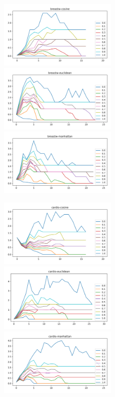 \begin{figure}[!t]
\includegraphics[width=2.2in]{kdd/static/lfd_vs_depth/breastw-cosine.png}
\includegraphics[width=2.2in]{kdd/static/lfd_vs_depth/breastw-euclidean.png}
\includegraphics[width=2.2in]{kdd/static/lfd_vs_depth/breastw-manhattan.png}

\includegraphics[width=2.2in]{kdd/static/lfd_vs_depth/cardio-cosine.png}
\includegraphics[width=2.2in]{kdd/static/lfd_vs_depth/cardio-euclidean.png}
\includegraphics[width=2.2in]{kdd/static/lfd_vs_depth/cardio-manhattan.png}


\end{figure}
